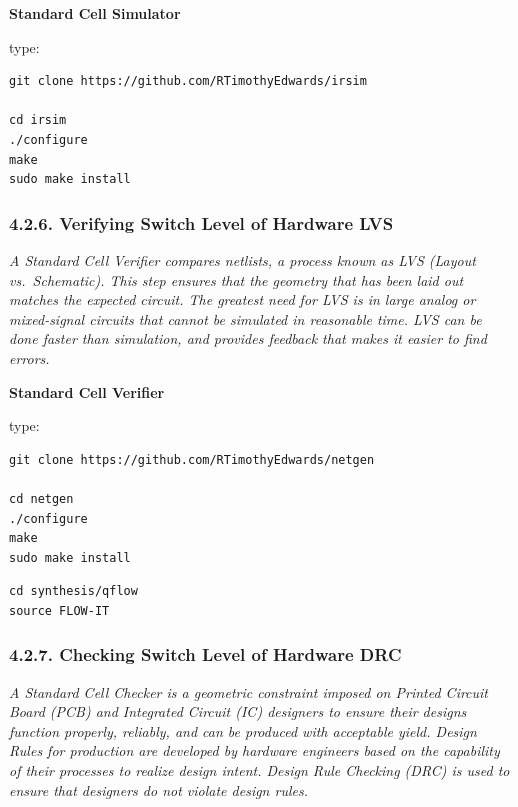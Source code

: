\documentclass[
]{article}
\begin{document}
\textbf{Standard Cell Simulator}

type:

\begin{verbatim}
git clone https://github.com/RTimothyEdwards/irsim

cd irsim
./configure
make
sudo make install
\end{verbatim}

\hypertarget{verifying-switch-level-of-hardware-lvs-1}{%
\subsubsection{4.2.6. Verifying Switch Level of Hardware
LVS}\label{verifying-switch-level-of-hardware-lvs-1}}

\emph{A Standard Cell Verifier compares netlists, a process known as LVS
(Layout vs.~Schematic). This step ensures that the geometry that has
been laid out matches the expected circuit. The greatest need for LVS is
in large analog or mixed-signal circuits that cannot be simulated in
reasonable time. LVS can be done faster than simulation, and provides
feedback that makes it easier to find errors.}

\textbf{Standard Cell Verifier}

type:

\begin{verbatim}
git clone https://github.com/RTimothyEdwards/netgen

cd netgen
./configure
make
sudo make install
\end{verbatim}

\begin{verbatim}
cd synthesis/qflow
source FLOW-IT
\end{verbatim}

\hypertarget{checking-switch-level-of-hardware-drc-1}{%
\subsubsection{4.2.7. Checking Switch Level of Hardware
DRC}\label{checking-switch-level-of-hardware-drc-1}}

\emph{A Standard Cell Checker is a geometric constraint imposed on
Printed Circuit Board (PCB) and Integrated Circuit (IC) designers to
ensure their designs function properly, reliably, and can be produced
with acceptable yield. Design Rules for production are developed by
hardware engineers based on the capability of their processes to realize
design intent. Design Rule Checking (DRC) is used to ensure that
designers do not violate design rules.}
\end{document}
